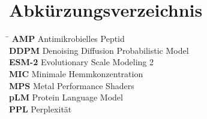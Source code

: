 \chapter*{Abk\"urzungsverzeichnis}

\begin{tabbing}
\hspace*{3.5cm}\=\kill
\textbf{AMP}     \> Antimikrobielles Peptid\\
\textbf{DDPM}    \> Denoising Diffusion Probabilistic Model\\
\textbf{ESM-2}   \> Evolutionary Scale Modeling 2\\
\textbf{MIC}     \> Minimale Hemmkonzentration\\
\textbf{MPS}     \> Metal Performance Shaders\\
\textbf{pLM}     \> Protein Language Model\\
\textbf{PPL}     \> Perplexit\"at\\
\end{tabbing}
